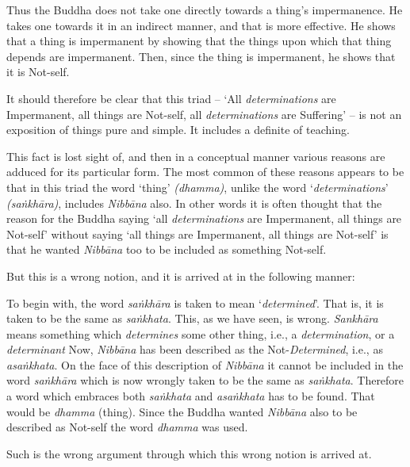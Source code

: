Thus the Buddha does not take one directly towards a thing's impermanence. He takes one towards it in an indirect manner, and that is more effective. He shows that a thing is impermanent by showing that the things upon which that thing depends are impermanent. Then, since the thing is impermanent, he shows that it is Not-self.

It should therefore be clear that this triad -- `All \emph{determinations} are Impermanent, all things are Not-self, all \emph{determinations} are Suffering' -- is not an exposition of things pure and simple. It includes a definite  of teaching.

This fact is lost sight of, and then in a conceptual manner various reasons are adduced for its particular form. The most common of these reasons appears to be that in this triad the word `thing' \emph{(dhamma)}, unlike the word `\emph{determinations}' \emph{(saṅkhāra)}, includes \emph{Nibbāna} also. In other words it is often thought that the reason for the Buddha saying `all \emph{determinations} are Impermanent, all things are Not-self' without saying `all things are Impermanent, all things are Not-self' is that he wanted \emph{Nibbāna} too to be included as something Not-self.

But this is a wrong notion, and it is arrived at in the following manner:

To begin with, the word \emph{saṅkhāra} is taken to mean `\emph{determined}'. That is, it is taken to be the same as \emph{saṅkhata}. This, as we have seen, is wrong. \emph{Sankhāra} means something which \emph{determines} some other thing, i.e., a \emph{determination}, or a \emph{determinant} Now, \emph{Nibbāna} has been described as the Not-\emph{Determined}, i.e., as \emph{asaṅkhata}. On the face of this description of \emph{Nibbāna} it cannot be included in the word \emph{saṅkhāra} which is now wrongly taken to be the same as \emph{saṅkhata}. Therefore a word which embraces both \emph{saṅkhata} and \emph{asaṅkhata} has to be found. That would be \emph{dhamma} (thing). Since the Buddha wanted \emph{Nibbāna} also to be described as Not-self the word \emph{dhamma} was used.

Such is the wrong argument through which this wrong notion is arrived at.

\enlargethispage{\baselineskip}

